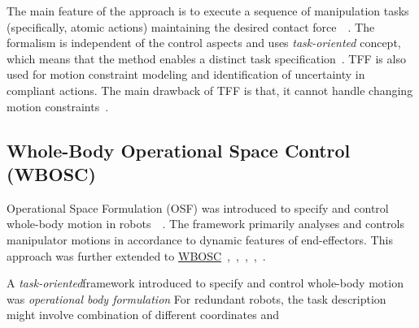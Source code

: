 The main feature of the approach is to execute a sequence of manipulation tasks (specifically, atomic actions) maintaining the desired contact force~\cite{mason1981compliance}~\cite{doi:10.1177/027836498800700402}. The formalism is independent of the control aspects and uses \textit{task-oriented} concept, which means that the method enables a distinct task specification~\cite{bruyninckx1996specification}. TFF is also used for motion constraint modeling and identification of uncertainty in compliant actions. The main drawback of TFF is that, it cannot handle changing motion constraints~\cite{bruyninckx1995kinematic}. 



\subsection{Whole-Body Operational Space Control (WBOSC)}

Operational Space Formulation (OSF) was introduced to specify and control whole-body motion in robots~\cite{khatib1987unified}~\cite{khatib1987optimization}. The framework primarily analyses and controls manipulator motions in accordance to dynamic features of end-effectors. This approach was further extended to \hyperref[wbosc]{WBOSC}~\cite{khatib2004whole},~\cite{chang2000operational},~\cite{sentis2006whole},~\cite{sentis2005synthesis},~\cite{khatib2008unified}.

A \textit{task-oriented}framework introduced to specify and control whole-body motion was \textit{operational body formulation} For redundant robots, the task description might involve combination of different coordinates and 



